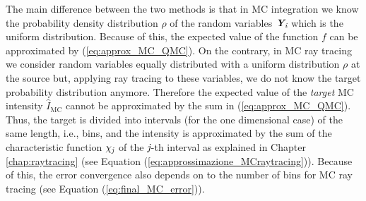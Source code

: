 The main difference between the two methods is that in MC integration we know the probability density distribution $\rho$ of the random variables $\textit{\textbf{Y}}_{\textit{i}}$ which is the uniform distribution. Because of this, the expected value of the function $f$ can be approximated by (\ref{eq:approx_MC_QMC}). On the contrary, in MC ray tracing we consider random variables equally distributed with a uniform distribution $\rho$ at the source but, applying ray tracing to these variables, we do not know the target probability distribution anymore. Therefore the expected value of the \textit{target} MC intensity $\hat{I}_{\textrm{MC}}$ cannot be approximated by the sum in (\ref{eq:approx_MC_QMC}). Thus, the target is divided into intervals (for the one dimensional case) of the same length, i.e., bins, and the intensity is approximated by the sum of the characteristic function $\chi_{\textit{j}}$ of the $\textit{j}$-th interval as explained in Chapter \ref{chap:raytracing} (see Equation (\ref{eq:approssimazione_MCraytracing})). Because of this, the error convergence also depends on to the number of bins for MC ray tracing (see Equation (\ref{eq:final_MC_error})).











